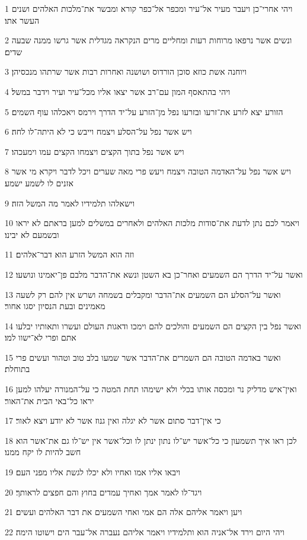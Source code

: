 \par 1 ויהי אחרי־כן ויעבר מעיר אל־עיר ומכפר אל־כפר קורא ומבשר את־מלכות האלהים ושנים העשר אתו׃
\par 2 ונשים אשר נרפאו מרוחות רעות ומחליים מרים הנקראה מגדלית אשר גרשו ממנה שבעה שדים׃
\par 3 ויוחנה אשת כוזא סוכן הורדוס ושושנה ואחרות רבות אשר שרתהו מנכסיהן׃
\par 4 ויהי בהתאסף המון עם־רב אשר יצאו אליו מכל־עיר ועיר וידבר במשל׃
\par 5 הזורע יצא לזרע את־זרעו ובזרעו נפל מן־הזרע על־יד הדרך וירמס ויאכלהו עוף השמים׃
\par 6 ויש אשר נפל על־הסלע ויצמח וייבש כי לא היתה־לו לחה׃
\par 7 ויש אשר נפל בתוך הקצים ויצמחו הקצים עמו וימעכהו׃
\par 8 ויש אשר נפל על־האדמה הטובה ויצמח ויעש פרי מאה שערים ויכל לדבר ויקרא מי אשר אזנים לו לשמע ישמע׃
\par 9 וישאלהו תלמידיו לאמר מה המשל הזה׃
\par 10 ויאמר לכם נתן לדעת את־סודות מלכות האלהים ולאחרים במשלים למען בראתם לא יראו ובשמעם לא יבינו׃
\par 11 וזה הוא המשל הזרע הוא דבר־אלהים׃
\par 12 ואשר על־יד הדרך הם השמעים ואחר־כן בא השטן ונשא את־הדבר מלבם פן־יאמינו ונושעו׃
\par 13 ואשר על־הסלע הם השמעים את־הדבר ומקבלים בשמחה ושרש אין להם רק לשעה מאמינים ובעת הנסיון יסגו אחור׃
\par 14 ואשר נפל בין הקצים הם השמעים והולכים להם וימכו ודאגות העולם ועשרו ותאותיו יבלעו אתם ופרי לא־ישוו למו׃
\par 15 ואשר באדמה הטובה הם השמרים את־הדבר אשר שמעו בלב טוב וטהור ועשים פרי בתוחלת׃
\par 16 ואין־איש מדליק נר ומכסה אותו בכלי ולא ישימהו תחת המטה כי על־המנורה יעלהו למען יראו כל־באי הבית את־האור׃
\par 17 כי אין־דבר סתום אשר לא יגלה ואין גנוז אשר לא יודע ויצא לאור׃
\par 18 לכן ראו איך תשמעון כי כל־אשר יש־לו נתון ינתן לו וכל־אשר אין יש־לו גם את־אשר הוא חשב להיות לו יקח ממנו׃
\par 19 ויבאו אליו אמו ואחיו ולא יכלו לגשת אליו מפני העם׃
\par 20 ויגד־לו לאמר אמך ואחיך עמדים בחוץ והם חפצים לראותך׃
\par 21 ויען ויאמר אליהם אלה הם אמי ואחי השמעים את דבר האלהים ועשים׃
\par 22 ויהי היום וירד אל־אניה הוא ותלמידיו ויאמר אליהם נעברה אל־עבר הים וישוטו הימה׃
